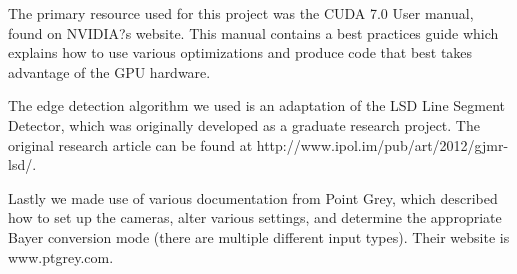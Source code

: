 The primary resource used for this project was the CUDA 7.0 User manual, found on NVIDIA?s website. This manual contains a best practices guide which explains how to use various optimizations and produce code that best takes advantage of the GPU hardware. \\
\par
The edge detection algorithm we used is an adaptation of the LSD Line Segment Detector, which was originally developed as a graduate research project. The original research article can be found at http://www.ipol.im/pub/art/2012/gjmr-lsd/.\\
\par
Lastly we made use of various documentation from Point Grey, which described how to set up the cameras, alter various settings, and determine the appropriate Bayer conversion mode (there are multiple different input types). Their website is www.ptgrey.com.\\
